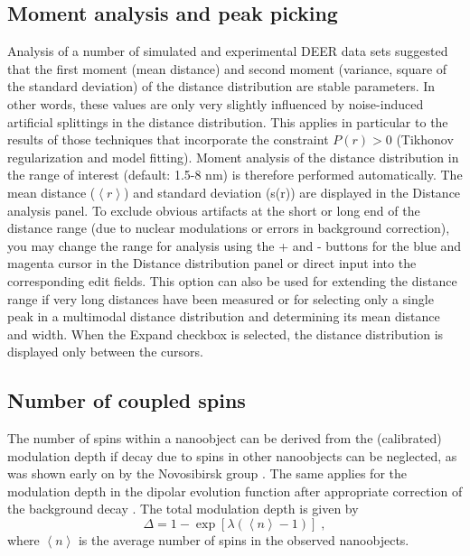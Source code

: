 \documentclass{article}
\begin{document}
\subsection{Moment analysis and peak picking}
Analysis of a number of simulated and experimental DEER data sets suggested
that the first moment (mean distance) and second moment (variance, square of
the standard deviation) of the distance distribution are stable parameters. In
other words, these values are only very slightly influenced by noise-induced artificial splittings in the distance distribution. This applies
in particular to the results of those techniques that incorporate the constraint
$P(r) > 0$ (Tikhonov regularization and model fitting). Moment analysis of the distance distribution in the range of interest (default: 1.5-8 nm) is therefore performed automatically. The mean distance ($\left\langle r \right\rangle$) and standard deviation (s(r)) are displayed in the {\ttfamily Distance analysis} panel. To exclude obvious artifacts
at the short or long end of the distance range (due to nuclear modulations or
errors in background correction), you may change the range for analysis using
the {\ttfamily +} and {\ttfamily -} buttons for the blue and magenta cursor in the {\ttfamily Distance distribution} panel or direct input into the corresponding edit fields. This option can also be used for extending the distance range if very long distances have been measured or for selecting only a single peak in a multimodal distance distribution and determining its mean distance and width.  When the {\ttfamily Expand} checkbox is selected, the distance distribution is displayed only between the cursors. 

\subsection{Number of coupled spins}
\label{numspins}
The number of spins within a nanoobject can be derived from the (calibrated)
modulation depth if decay due to spins in other nanoobjects can be neglected,
as was shown early on by the Novosibirsk group \cite{milov1984}. The same applies for
the modulation depth in the dipolar evolution function after appropriate correction
of the background decay \cite{jeschke2004a}. The total modulation depth is given by
\begin{equation}
	\Delta = 1 - \exp \left[ \lambda \left( \left\langle n \right\rangle - 1 \right) \right] \; ,
\end{equation}
where $\left\langle n \right\rangle$ is the average number of spins in the observed nanoobjects.
 
\end{document}
